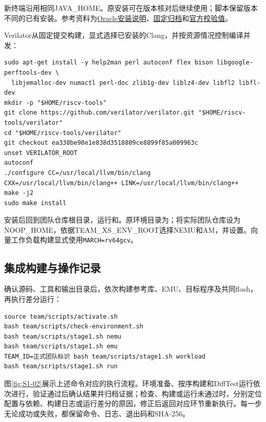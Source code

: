 新终端沿用相同JAVA\_HOME。原安装可在版本核对后继续使用；脚本保留版本不同的已有安装。参考资料为\href{https://docs.oracle.com/en/graalvm/jdk/21/docs/getting-started/installation-linux/}{Oracle安装说明}、\href{https://download.oracle.com/graalvm/21/archive/graalvm-jdk-21.0.12\_linux-x64\_bin.tar.gz}{固定归档}和\href{https://download.oracle.com/graalvm/21/archive/graalvm-jdk-21.0.12\_linux-x64\_bin.tar.gz.sha256}{官方校验值}。

Verilator从固定提交构建，显式选择已安装的Clang，并按资源情况控制编译并发：
\begin{Verbatim}[breaklines,breakanywhere,breaksymbolleft={},breaksymbolright={},fontsize=\footnotesize,baselinestretch=1]
sudo apt-get install -y help2man perl autoconf flex bison libgoogle-perftools-dev \
  libjemalloc-dev numactl perl-doc zlib1g-dev liblz4-dev libfl2 libfl-dev
mkdir -p "$HOME/riscv-tools"
git clone https://github.com/verilator/verilator.git "$HOME/riscv-tools/verilator"
cd "$HOME/riscv-tools/verilator"
git checkout ea338be98e1e838d3518809ce8899f85a009963c
unset VERILATOR_ROOT
autoconf
./configure CC=/usr/local/llvm/bin/clang CXX=/usr/local/llvm/bin/clang++ LINK=/usr/local/llvm/bin/clang++
make -j2
sudo make install
\end{Verbatim}

安装后回到团队仓库根目录，运行和。原环境目录为；将实际团队仓库设为NOOP\_HOME，依据TEAM\_XS\_ENV\_ROOT选择NEMU和AM，并设置。向量工作负载构建显式使用\Verb|MARCH=rv64gcv|。

\subsection{集成构建与操作记录}

确认源码、工具和输出目录后，依次构建参考库、EMU、目标程序及共同flash，再执行差分运行：
\begin{Verbatim}[breaklines,breakanywhere,breaksymbolleft={},breaksymbolright={},fontsize=\footnotesize,baselinestretch=1]
source team/scripts/activate.sh
bash team/scripts/check-environment.sh
bash team/scripts/stage1.sh nemu
bash team/scripts/stage1.sh emu
TEAM_ID=正式团队标识 bash team/scripts/stage1.sh workload
bash team/scripts/stage1.sh run
\end{Verbatim}

图\ref{fig:S1-02}展示上述命令对应的执行流程。环境准备、按序构建和DiffTest运行依次进行，验证通过后确认结果并归档证据；检查、构建或运行未通过时，分别定位配置与依赖、构建日志或运行差分的原因，修正后返回对应环节重新执行。每一步无论成功或失败，都保留命令、日志、退出码和SHA-256。

